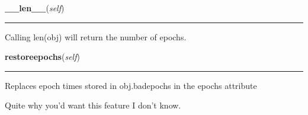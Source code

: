     \label{spacepy:seapy:Sea:__len__}

    \vspace{0.5ex}

\hspace{.8\funcindent}\begin{boxedminipage}{\funcwidth}

    \raggedright \textbf{\_\_len\_\_}(\textit{self})

    \vspace{-1.5ex}

    \rule{\textwidth}{0.5\fboxrule}
\setlength{\parskip}{2ex}
    Calling len(obj) will return the number of epochs.

\setlength{\parskip}{1ex}
    \end{boxedminipage}

    \label{spacepy:seapy:Sea:restoreepochs}

    \vspace{0.5ex}

\hspace{.8\funcindent}\begin{boxedminipage}{\funcwidth}

    \raggedright \textbf{restoreepochs}(\textit{self})

    \vspace{-1.5ex}

    \rule{\textwidth}{0.5\fboxrule}
\setlength{\parskip}{2ex}
    Replaces epoch times stored in obj.badepochs in the epochs attribute

    Quite why you'd want this feature I don't know.

\setlength{\parskip}{1ex}
    \end{boxedminipage}

    \label{spacepy:seapy:Sea:sea}

    \vspace{0.5ex}

